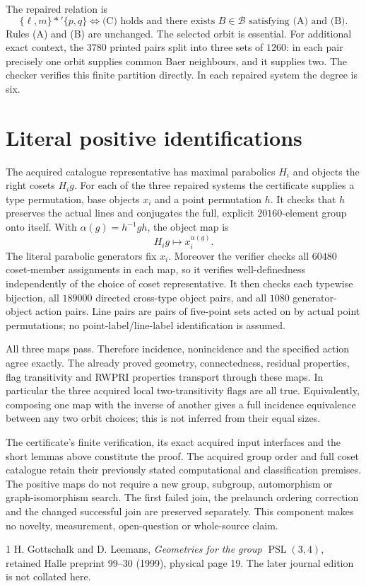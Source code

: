 \documentclass[11pt]{article}
\begin{document}
The repaired relation is
\[
\{\ell,m\}*'\{p,q\}\iff\text{(C) holds and there exists }B\in\mathcal B
\text{ satisfying (A) and (B).}
\]
Rules (A) and (B) are unchanged. The selected orbit is essential.
For additional exact context, the $3780$ printed pairs split into three
sets of $1260$: in each pair precisely one orbit supplies common Baer
neighbours, and it supplies two. The checker verifies this finite
partition directly. In each repaired system the degree is six.

\section{Literal positive identifications}
The acquired catalogue representative has maximal parabolics $H_i$
and objects the right cosets $H_i g$. For each of the three repaired
systems the certificate supplies a type permutation, base objects
$x_i$ and a point permutation $h$. It checks that $h$ preserves the
actual lines and conjugates the full, explicit $20160$-element group
onto itself. With $\alpha(g)=h^{-1}gh$, the object map is
\[
             H_i g\longmapsto x_i^{\alpha(g)}.
\]
The literal parabolic generators fix $x_i$. Moreover the verifier
checks all $60480$ coset-member assignments in each map, so it verifies
well-definedness independently of the choice of coset representative.
It then checks each typewise bijection, all $189000$ directed
cross-type object pairs, and all $1080$ generator-object action pairs.
Line pairs are pairs of five-point sets acted on by actual point
permutations; no point-label/line-label identification is assumed.

All three maps pass. Therefore incidence, nonincidence and the specified
action agree exactly. The already proved geometry, connectedness,
residual properties, flag transitivity and RWPRI properties transport
through these maps. In particular the three acquired local
two-transitivity flags are all true. Equivalently, composing one map
with the inverse of another gives a full incidence equivalence between
any two orbit choices; this is not inferred from their equal sizes.

The certificate's finite verification, its exact acquired input
interfaces and the short lemmas above constitute the proof. The
acquired group order and full coset catalogue retain their previously
stated computational and classification premises. The positive maps
do not require a new group, subgroup, automorphism or graph-isomorphism
search. The first failed join, the prelaunch ordering correction and
the changed successful join are preserved separately. This component
makes no novelty, measurement, open-question or whole-source claim.

\begin{thebibliography}{1}
 H. Gottschalk and D. Leemans,
\emph{Geometries for the group $\operatorname{PSL}(3,4)$},
retained Halle preprint 99--30 (1999), physical page 19.
The later journal edition is not collated here.
\end{thebibliography}
\end{document}

